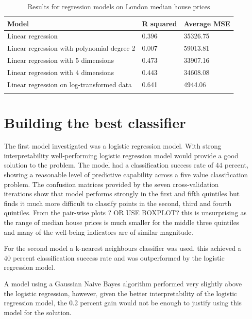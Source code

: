 \begin{table}
\caption{Results for regression models on London median house prices}
\centering
\begin{tabular}{l l l}
\toprule
Model & R squared & Average MSE \\
\midrule
Linear regression & 0.396 & 35326.75\\
Linear regression with  polynomial degree 2 & 0.007 & 59013.81\\
Linear regression with 5 dimensions & 0.473 & 33907.16\\
Linear regression with 4 dimensions & 0.443 & 34608.08\\
Linear regression on log-transformed data & 0.641 & 4944.06\\
\bottomrule\\
\end{tabular}
\end{table}



\section{Building the best classifier}

The first model investigated was a logistic regression model. With strong interpretability well-performing logistic regression model would provide a good solution to the problem.
The model had a classification success rate of 44 percent, showing a reasonable level of predictive capability across a five value classification problem. The confusiion matrices provided by the seven cross-validation iterations show that model performs strongly in the first and fifth quintiles but finds it much more difficult to classify points in the second, third and fourth quintiles.
From the pair-wise plots ? OR USE BOXPLOT? this is unsurprising as the range of median house prices is much smaller for the middle three quintiles and many of the well-being indicators are of similar magnitude.

For the second model a k-nearest neighbours classifier was used, this achieved a 40 percent classification success rate and was outperformed by the logistic regression model.

A model using a Gaussian Naive Bayes algorithm performed very slightly above the logistic regression, however, given the better interpretability of the logistic regression model, the 0.2 percent gain would not be enough to justify using this model for the solution.

